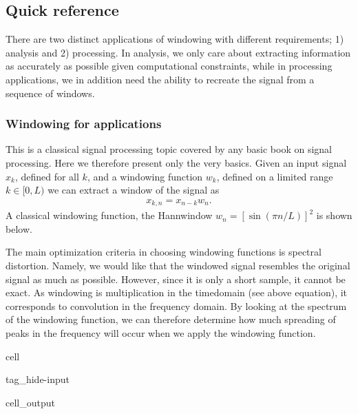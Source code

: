 \documentclass[letterpaper,10pt,english]{jupyterBook}
\begin{document}
\subsection{Quick reference}
\label{\detokenize{Representations/Windowing:quick-reference}}
\sphinxAtStartPar
There are two distinct applications of windowing with different
requirements; 1) analysis and 2) processing. In analysis, we only care
about extracting information as accurately as possible given
computational constraints, while in processing applications, we in
addition need the ability to recreate the signal from a sequence of
windows.


\subsubsection{Windowing for  applications}
\label{\detokenize{Representations/Windowing:windowing-for-analysis-applications}}
\sphinxAtStartPar
This is a classical signal processing topic covered by any basic book on
signal processing. Here we therefore present only the very
basics. Given an input signal \(x_k\), defined for all \(k\), and
a windowing function \(w_k\), defined on a limited range \(k\in[0,L) \) we can extract a window of the signal as
\begin{equation*}
\begin{split} x_{k,n}=x_{n-k}w_n. \end{split}
\end{equation*}
\sphinxAtStartPar
A classical windowing function, the Hann\sphinxhyphen{}window \(
w_n=\left[\sin\left(\pi n/L\right)\right]^2 \) is shown
below.

\sphinxAtStartPar
The main optimization criteria in choosing windowing functions is
spectral distortion. Namely, we would like that the windowed signal
resembles the original signal as much as possible. However, since it is
only a short sample, it cannot be exact. As windowing is multiplication
in the time\sphinxhyphen{}domain (see above equation), it corresponds to convolution
in the frequency domain. By looking at the spectrum of the windowing
function, we can therefore determine how much spreading of peaks in the
frequency will occur when we apply the windowing function.



\begin{sphinxuseclass}{cell}
\begin{sphinxuseclass}{tag_hide-input}\begin{sphinxVerbatimOutput}

\begin{sphinxuseclass}{cell_output}
\noindent{}

\end{sphinxuseclass}\end{sphinxVerbatimOutput}

\end{sphinxuseclass}
\end{sphinxuseclass}
\end{document}
